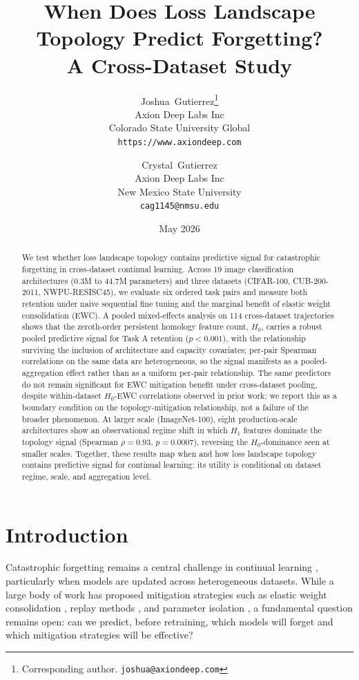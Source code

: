 \documentclass[10pt,twocolumn]{article}
\title{When Does Loss Landscape Topology Predict Forgetting?\\A Cross-Dataset Study}
\author{
  Joshua~Gutierrez\thanks{Corresponding author. \texttt{joshua@axiondeep.com}} \\
  Axion Deep Labs Inc \\
  Colorado State University Global \\
  \texttt{https://www.axiondeep.com}
  \and
  Crystal~Gutierrez \\
  Axion Deep Labs Inc \\
  New Mexico State University \\
  \texttt{cag1145@nmsu.edu}
}
\date{May 2026}
\begin{document}
\maketitle

\begin{abstract}
We test whether loss landscape topology contains predictive signal for catastrophic forgetting in cross-dataset continual learning. Across 19 image classification architectures (0.3M to 44.7M parameters) and three datasets (CIFAR-100, CUB-200-2011, NWPU-RESISC45), we evaluate six ordered task pairs and measure both retention under naive sequential fine tuning and the marginal benefit of elastic weight consolidation (EWC). A pooled mixed-effects analysis on 114 cross-dataset trajectories shows that the zeroth-order persistent homology feature count, $H_0$, carries a robust pooled predictive signal for Task A retention ($p < 0.001$), with the relationship surviving the inclusion of architecture and capacity covariates; per-pair Spearman correlations on the same data are heterogeneous, so the signal manifests as a pooled-aggregation effect rather than as a uniform per-pair relationship. The same predictors do not remain significant for EWC mitigation benefit under cross-dataset pooling, despite within-dataset $H_0$-EWC correlations observed in prior work; we report this as a boundary condition on the topology-mitigation relationship, not a failure of the broader phenomenon. At larger scale (ImageNet-100), eight production-scale architectures show an observational regime shift in which $H_1$ features dominate the topology signal (Spearman $\rho = 0.93$, $p = 0.0007$), reversing the $H_0$-dominance seen at smaller scales. Together, these results map when and how loss landscape topology contains predictive signal for continual learning: its utility is conditional on dataset regime, scale, and aggregation level.
\end{abstract}

\section{Introduction}
\label{sec:intro}

Catastrophic forgetting remains a central challenge in continual learning \citep{mccloskey1989catastrophic, french1999catastrophic}, particularly when models are updated across heterogeneous datasets. While a large body of work has proposed mitigation strategies such as elastic weight consolidation \citep[EWC;][]{kirkpatrick2017overcoming}, replay methods \citep{rebuffi2017icarl, shin2017continual}, and parameter isolation \citep{rusu2016progressive, mallya2018packnet}, a fundamental question remains open: can we predict, before retraining, which models will forget and which mitigation strategies will be effective?
\end{document}
